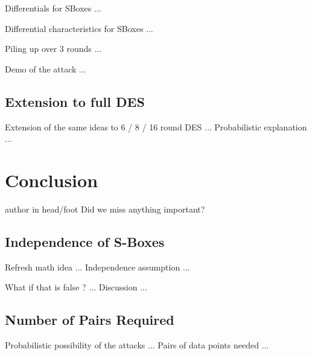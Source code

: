 \documentclass[9pt]{beamer}
\begin{document}
\begin{frame}
Differentials for SBoxes ...

\end{frame}

\begin{frame}
Differential characteristics for SBoxes ...

\end{frame}

\begin{frame}
Piling up over 3 rounds ...

\end{frame}

\begin{frame}
Demo of the attack ...

\end{frame}

\subsection{Extension to full DES}
\begin{frame}
Extension of the same ideas to 6 / 8 / 16 round DES ... Probabilistic explanation ...

\end{frame}


\section{Conclusion}
\begin{frame}
\begin{beamercolorbox}[ht=2.5ex,dp=1.125ex,center,rounded=true,shadow=true]{author in head/foot}
Did we miss anything important?
\end{beamercolorbox}
\end{frame}

\subsection{Independence of S-Boxes}
\begin{frame}
Refresh math idea ... Independence assumption ...

\end{frame}

\begin{frame}
What if that is false ? ... Discussion ...

\end{frame}

\subsection{Number of Pairs Required}
\begin{frame}
Probabilistic possibility of the attacks ... Pairs of data points needed ...

\end{frame}
\end{document}
